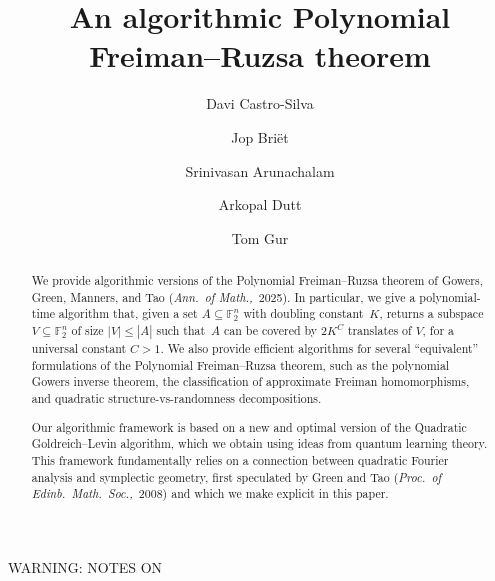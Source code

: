 \documentclass[11pt]{amsart}
\newcommand{\noteswarning}{{\begin{center} {\Large WARNING: NOTES ON}\end{center}}}
\newcommand{\noteswarning}{{}}
\theoremstyle{plain}
\theoremstyle{definition}
\theoremstyle{remark}
\begin{document}
\title{An algorithmic Polynomial Freiman--Ruzsa theorem}

\begin{abstract}
    We provide algorithmic versions of the Polynomial Freiman--Ruzsa theorem of Gowers, Green, Manners, and Tao (\emph{Ann.\ of Math.,}~2025).
    In particular, we give a polynomial-time algorithm that, given a set $A \subseteq \mathbb{F}_2^n$ with doubling constant~$K$, returns a subspace $V \subseteq \mathbb{F}_2^n$ of size $|V| \leq |A|$ such that~$A$ can be covered by $2K^C$ translates of $V$, for a universal constant $C>1$.
    We also provide efficient algorithms for several ``equivalent'' formulations of the Polynomial Freiman--Ruzsa theorem, such as the polynomial Gowers inverse theorem, the classification of approximate Freiman homomorphisms, and quadratic structure-vs-randomness decompositions.

    Our algorithmic framework is based on a new and optimal version of the Quadratic Goldreich--Levin algorithm, which we obtain using ideas from quantum learning theory.
    This framework fundamentally relies on a connection between quadratic Fourier analysis and symplectic geometry, first speculated by Green and Tao (\emph{Proc.\ of Edinb.\ Math.\ Soc.,}~2008) and which we make explicit in this paper.
\end{abstract}

\author[D.\ Castro-Silva]{Davi Castro-Silva}
\address{Department of Computer Science and Technology, University of Cambridge, UK}
\author[J.\ Bri\"{e}t]{Jop Bri\"et} 
\address{Centrum Wiskunde \& Informatica (CWI) and Leiden University, The Netherlands}
\author[S.\ Arunachalam]{Srinivasan Arunachalam}
\address{IBM Research, Silicon Valley Lab, USA}
\author[A.\ Dutt]{\newline Arkopal Dutt} 
\address{IBM Research, Cambridge, USA}
\author[T.\ Gur]{Tom Gur} 
\address{Department of Computer Science and Technology, University of Cambridge, UK}


\maketitle


\noteswarning
\end{document}
